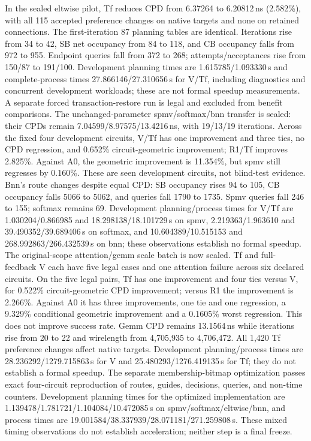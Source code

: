 \documentclass[conference,10pt]{IEEEtran}
\begin{document}
In the sealed eltwise pilot, Tf reduces CPD from 6.37264 to 6.20812\,ns (2.582\%), with all 115 accepted preference changes on native targets and none on retained connections. The first-iteration 87 planning tables are identical. Iterations rise from 34 to 42, SB net occupancy from 84 to 118, and CB occupancy falls from 972 to 955. Endpoint queries fall from 372 to 268; attempts/acceptances rise from 150/87 to 191/100. Development planning times are 1.615785/1.093330\,s and complete-process times 27.866146/27.310656\,s for V/Tf, including diagnostics and concurrent development workloads; these are not formal speedup measurements. A separate forced transaction-restore run is legal and excluded from benefit comparisons. The unchanged-parameter spmv/softmax/bnn transfer is sealed: their CPDs remain 7.04599/8.97575/13.4216\,ns, with 19/13/19 iterations. Across the fixed four development circuits, V/Tf has one improvement and three ties, no CPD regression, and 0.652\% circuit-geometric improvement; R1/Tf improves 2.825\%. Against A0, the geometric improvement is 11.354\%, but spmv still regresses by 0.160\%. These are seen development circuits, not blind-test evidence. Bnn's route changes despite equal CPD: SB occupancy rises 94 to 105, CB occupancy falls 5066 to 5062, and queries fall 1790 to 1735. Spmv queries fall 246 to 155; softmax remains 69. Development planning/process times for V/Tf are 1.030204/0.866985 and 18.298138/18.101729\,s on spmv, 2.219363/1.963610 and 39.490352/39.689406\,s on softmax, and 10.604389/10.515153 and 268.992863/266.432539\,s on bnn; these observations establish no formal speedup. The original-scope attention/gemm scale batch is now sealed. Tf and full-feedback V each have five legal cases and one attention failure across six declared circuits. On the five legal pairs, Tf has one improvement and four ties versus V, for 0.522\% circuit-geometric CPD improvement; versus R1 the improvement is 2.266\%. Against A0 it has three improvements, one tie and one regression, a 9.329\% conditional geometric improvement and a 0.1605\% worst regression. This does not improve success rate. Gemm CPD remains 13.1564\,ns while iterations rise from 20 to 22 and wirelength from 4,705,935 to 4,706,472. All 1,420 Tf preference changes affect native targets. Development planning/process times are 28.236292/1279.715863\,s for V and 25.480293/1276.419135\,s for Tf; they do not establish a formal speedup. The separate membership-bitmap optimization passes exact four-circuit reproduction of routes, guides, decisions, queries, and non-time counters. Development planning times for the optimized implementation are 1.139478/1.781721/1.104084/10.472085\,s on spmv/softmax/eltwise/bnn, and process times are 19.001584/38.337939/28.071181/271.259808\,s. These mixed timing observations do not establish acceleration; neither step is a final freeze.
\end{document}
